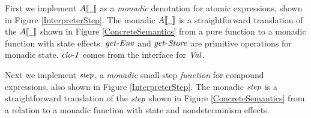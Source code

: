 \par

First we implement
$A \llbracket  \underline{\hspace{0.5em}}  \rrbracket $ as a
\emph{monadic} denotation for atomic expressions, shown in Figure
\ref{InterpreterStep}. The monadic
$A \llbracket  \underline{\hspace{0.5em}}  \rrbracket $ is a
straightforward translation of the
$A \llbracket  \underline{\hspace{0.5em}}  \rrbracket $ shown in Figure
\ref{ConcreteSemantics} from a pure function to a monadic function with
state effects. $ \operatorname{\mathit{get-Env}} $ and $ \operatorname{\mathit{get-Store}} $ are primitive
operations for monadic state. $ \operatorname{\mathit{clo-I}} $ comes from the interface
for $ \operatorname{\mathit{Val}} $.

\par

Next we implement $ \operatorname{\mathit{step}} $, a \emph{monadic} small-step
\emph{function} for compound expressions, also shown in Figure
\ref{InterpreterStep}. The monadic $ \operatorname{\mathit{step}} $ is a straightforward
translation of the $ \operatorname{\mathit{step}} $ shown in Figure
\ref{ConcreteSemantics} from a relation to a monadic function with state
and nondeterminism effects.

\par

